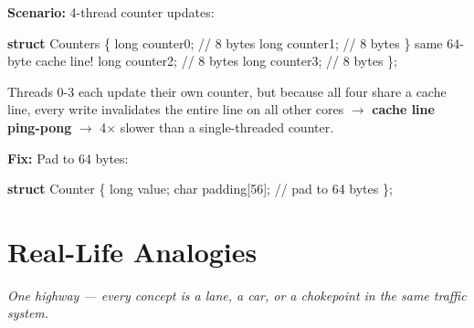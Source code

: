 \documentclass[11pt]{article}
\newenvironment{Shaded}{\begin{snugshade}}{\end{snugshade}}
\newcommand{\CommentTok}[1]{\textcolor[rgb]{0.48,0.49,0.49}{#1}}
\newcommand{\DataTypeTok}[1]{\textcolor[rgb]{0.16,0.50,0.73}{#1}}
\newcommand{\DecValTok}[1]{\textcolor[rgb]{0.96,0.45,0.00}{#1}}
\newcommand{\KeywordTok}[1]{\textcolor[rgb]{0.81,0.81,0.76}{\textbf{#1}}}
\newcommand{\NormalTok}[1]{\textcolor[rgb]{0.81,0.81,0.76}{#1}}
\newcommand{\OperatorTok}[1]{\textcolor[rgb]{0.81,0.81,0.76}{#1}}
\begin{document}
\textbf{Scenario:} 4-thread counter updates:


\begin{Shaded}
\begin{Highlighting}[]
\KeywordTok{struct}\NormalTok{ Counters }\OperatorTok{\{}
    \DataTypeTok{long}\NormalTok{ counter0}\OperatorTok{;}   \CommentTok{// 8 bytes}
    \DataTypeTok{long}\NormalTok{ counter1}\OperatorTok{;}   \CommentTok{// 8 bytes  \} same 64{-}byte cache line!}
    \DataTypeTok{long}\NormalTok{ counter2}\OperatorTok{;}   \CommentTok{// 8 bytes}
    \DataTypeTok{long}\NormalTok{ counter3}\OperatorTok{;}   \CommentTok{// 8 bytes}
\OperatorTok{\};}
\end{Highlighting}
\end{Shaded}

Threads 0-3 each update their own counter, but because all four share a cache line, every write invalidates the entire line on all other cores \(\rightarrow\) \textbf{cache line ping-pong} \(\rightarrow\) 4\(\times\) slower than a single-threaded counter.

\textbf{Fix:} Pad to 64 bytes:


\begin{Shaded}
\begin{Highlighting}[]
\KeywordTok{struct}\NormalTok{ Counter }\OperatorTok{\{}
    \DataTypeTok{long}\NormalTok{ value}\OperatorTok{;}
    \DataTypeTok{char}\NormalTok{ padding}\OperatorTok{[}\DecValTok{56}\OperatorTok{];}  \CommentTok{// pad to 64 bytes}
\OperatorTok{\};}
\end{Highlighting}
\end{Shaded}

\section{Real-Life Analogies}\label{real-life-analogies}

\emph{One highway --- every concept is a lane, a car, or a chokepoint in the same traffic system.}
\end{document}
